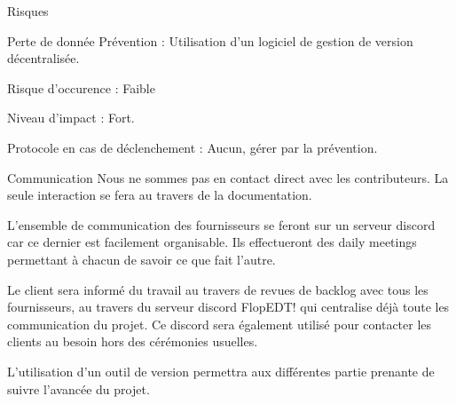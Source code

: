 \documentclass[]{article}
\begin{document}
\begin{section}{Risques}
        \begin{subsection}{Perte de donnée}
            Prévention : Utilisation d’un logiciel de gestion de version décentralisée.

            Risque d’occurence : Faible

            Niveau d’impact : Fort.

            Protocole en cas de déclenchement : Aucun, gérer par la prévention.
        \end{subsection}
    \end{section}

    \begin{section}{Communication}
        Nous ne sommes pas en contact direct avec les contributeurs. La seule interaction se fera au travers
        de la documentation.

        L’ensemble de communication des fournisseurs se feront sur un serveur discord car ce dernier est
        facilement organisable. Ils effectueront des daily meetings permettant à chacun de savoir ce que fait
        l’autre.

        Le client sera informé du travail au travers de revues de backlog avec tous les fournisseurs, au
        travers du serveur discord FlopEDT! qui centralise déjà toute les communication du projet. Ce
        discord sera également utilisé pour contacter les clients au besoin hors des cérémonies usuelles.

        L’utilisation d’un outil de version permettra aux différentes partie prenante de suivre l’avancée du
        projet.
        
    \end{section}
\end{document}
